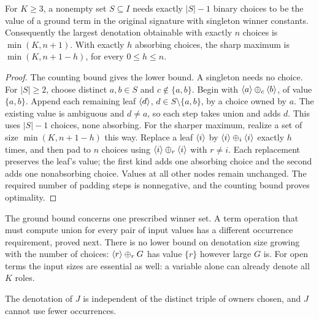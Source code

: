 \begin{corollary}\label{game:cor:ground-size}
For $K\geq3$, a nonempty set $S\subseteq I$ needs exactly $|S|-1$
binary choices to be the value of a ground term in the original
signature with singleton winner constants. Consequently the
largest denotation obtainable with exactly $n$ choices is
$\min(K,n+1)$. With exactly $h$ absorbing choices, the sharp maximum
is $\min(K,n+1-h)$, for every $0\leq h\leq n$.
\end{corollary}
\begin{proof}
The counting bound gives the lower bound. A singleton needs no
choice. For $|S|\geq2$, choose distinct $a,b\in S$ and
$c\notin\{a,b\}$. Begin with $\langle a\rangle\mathbin{\oplus_{c}}\langle b\rangle$, of value
$\{a,b\}$. Append each remaining leaf $\langle d\rangle$, $d\in S\setminus\{a,b\}$,
by a choice owned by $a$. The existing value is ambiguous and
$d\ne a$, so each step takes union and adds $d$. This uses $|S|-1$
choices, none absorbing. For the sharper maximum, realize a set of
size $\min(K,n+1-h)$ this way. Replace a leaf $\langle i\rangle$ by
$\langle i\rangle\mathbin{\oplus_{i}}\langle i\rangle$ exactly $h$ times, and then pad to $n$ choices
using $\langle i\rangle\mathbin{\oplus_{r}}\langle i\rangle$ with $r\ne i$. Each replacement preserves
the leaf's value; the first kind adds one absorbing choice and the
second adds one nonabsorbing choice. Values at all other nodes remain
unchanged. The required number of padding steps is nonnegative, and
the counting bound proves optimality.
\end{proof}

The ground bound concerns one prescribed winner set. A term operation
that must compute union for every pair of input values has a different
occurrence requirement, proved next. There is no lower bound on
denotation size growing with the number of choices:
$\langle r\rangle\mathbin{\oplus_{r}} G$ has value $\{r\}$ however large $G$ is. For open
terms the input sizes are essential as well: a variable alone can
already denote all $K$ roles.

The denotation of $J$ is independent of the distinct
triple of owners chosen, and $J$ cannot use fewer occurrences.

